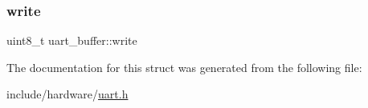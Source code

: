 \mbox{\label{structuart__buffer_aa8b5a4f36a111c66fce870c3e236f07f}} 
\subsubsection{\texorpdfstring{write}{write}}
{\footnotesize\ttfamily uint8\+\_\+t uart\+\_\+buffer\+::write}



The documentation for this struct was generated from the following file\+:\begin{DoxyCompactItemize}
\item 
include/hardware/\hyperlink{uart_8h}{uart.\+h}\end{DoxyCompactItemize}
